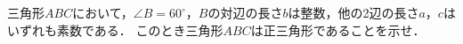 \documentclass[../../main.tex]{subfiles}
\begin{document}
三角形$ABC$において，$\angle B={60}^\circ$，$B$の対辺の長さ$b$は整数，他の2辺の長さ$a$，$c$はいずれも素数である．
このとき三角形$ABC$は正三角形であることを示せ．
\end{document}
